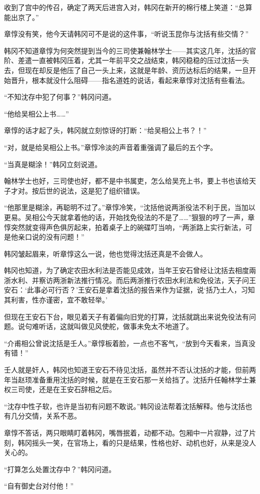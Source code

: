 收到了宫中的传召，确定了两天后进宫入对，韩冈在新开的棉行楼上笑道：“总算能出京了。”

章惇没有笑，他今天请韩冈可不是说的这件事，“听说玉昆你与沈括有些交情？”

韩冈不知道章惇为何突然提到当今的三司使兼翰林学士——其实这几年，沈括的官阶、差遣一直被韩冈压着，尤其一年前平交之战结束，韩冈稳稳的压过沈括一头去，但现在却反是他压了自己一头上来，这就是年龄、资历达标后的结果，一旦开始晋升，根本就没什么阻碍——指名道姓的说话，看起来章惇对沈括有些看法。

“不知沈存中犯了何事？”韩冈问道。

“他给吴相公上书……”

章惇的话才起了头，韩冈就立刻惊讶的打断：“给吴相公上书？！”

“对，就是给吴相公上书。”章惇冷淡的声音着重强调了最后的五个字。

“当真是糊涂！”韩冈立刻说道。

翰林学士也好，三司使也好，都不是中书属吏，怎么给吴充上书，要上书也该给天子才对。按后世的说法，这是犯了组织错误。

“他那里是糊涂，再聪明不过了。”章惇冷笑，“沈括他说两浙役法不利于民，当加以更易。吴相公今天就拿着他的话，开始找免役法的不是了……”狠狠的哼了一声，章惇突然就变得声色俱厉起来，拍着桌子上的碗碟叮当响，“两浙路上实行新法，可是他亲口说的没有问题！”

韩冈皱起眉来，听章惇这么一说，他也觉得沈括还真是不会做人。

韩冈也知道，为了确定农田水利法是否能见成效，当年王安石曾经让沈括去相度兩浙水利、并察访两浙新法推行情况。而后两浙推行农田水利法和免役法，天子问王安石：‘此事必可行否？’王安石是拿着沈括的报告来作为证据，说‘括乃土人，习知其利害，性亦谨密，宜不敢轻举。’

但现在王安石下台，眼见着天子有着偏向旧党的打算，沈括就跳出来说免役法有问题。说句难听话，这就叫做见风使舵，做事未免太不地道了。

“介甫相公曾说沈括是壬人。”章惇板着脸，一点也不客气，“放到今天看来，当真没有错！”

壬人就是奸人，韩冈也知道王安石不待见沈括，虽然并不否认沈括的才能，但前两年当赵顼准备重用沈括的时候，就是在王安石那一关给挡了。沈括升任翰林学士兼权三司使，还是在王安石辞相之后。

“沈存中性子软，也许是当初有问题不敢说。”韩冈设法帮着沈括解释。他与沈括也有几分交情，关系不恶。

章惇不答话，两只眼睛盯着韩冈，嘴唇抿着，动都不动。包厢中一片寂静，过了片刻，韩冈摇头一笑，在官场上，看的只是结果，性格也好、动机也好，从来是没人关心的。

“打算怎么处置沈存中？”韩冈问道。

“自有御史台对付他！”

